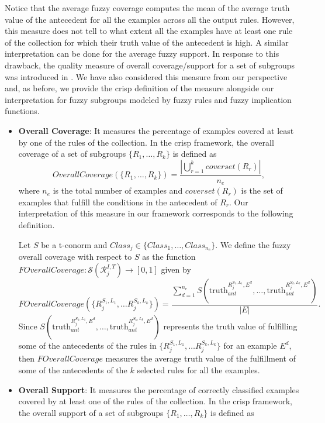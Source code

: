 Notice that the average fuzzy coverage computes the mean of the average truth value of the antecedent for all the examples across all the output rules. However, this measure does not tell to what extent all the examples have at least one rule of the collection for which their truth value of the antecedent is high. A similar interpretation can be done for the average fuzzy support. In response to this drawback, the quality measure of overall coverage/support for a set of subgroups was introduced in \cite{Helal2016}. We have also considered this measure from our perspective and, as before, we provide the crisp definition of the measure alongside our interpretation for fuzzy subgroups modeled by fuzzy rules and fuzzy implication functions.

\begin{itemize}
	\item \textbf{Overall Coverage}: It measures the percentage of examples covered at least by one of the rules of the collection. In the crisp framework, the overall coverage of a set of subgroups $\{R_1,\dots,R_k\}$ is defined as
	$$OverallCoverage(\{R_1,\dots,R_k\}) = \frac{ \left|\displaystyle \bigcup_{r=1}^k coverset(R_r)\right|}{n_e},$$
	where $n_e$ is the total number of examples and $coverset(R_r)$ is the set of examples that fulfill the conditions in the antecedent of $R_r$. Our interpretation of this measure in our framework corresponds to the following definition.
	\begin{definition}\label{def:FOverallCoverage}
		Let $S$ be a t-conorm and $Class_j \in \{Class_1,\dots,Class_{n_c}\}$. We define the fuzzy overall coverage with respect to $S$ as the function $FOverallCoverage : \mathcal{S}(\mathcal{R}^{I,T}_j) \to [0,1]$ given by 
		$$FOverallCoverage(\{R^{S_1,L_1}_{j},\dots R^{S_k,L_k}_{j}\}) = \frac{ \displaystyle \sum_{d=1}^{n_e}S(\text{truth}_{ant}^{R^{S_1,L_1}_j,E^d},\dots, \text{truth}_{ant}^{R^{S_k,L_k}_j,E^d})}{|E|}.$$
		Since $S(\text{truth}_{ant}^{R^{S_1,L_1}_j,E^d},\dots, \text{truth}_{ant}^{R^{S_k,L_k}_j,E^d})$ represents the truth value of fulfilling some of the antecedents of the rules in $\{R^{S_1,L_1}_{j},\dots R^{S_k,L_k}_{j}\}$ for an example $E^d$, then $FOverallCoverage$ measures the average truth value of the fulfillment of some of the antecedents of the $k$ selected  rules for all the examples.
	\end{definition}
	\item \textbf{Overall Support}: It measures the percentage of correctly classified examples covered by at least one of the rules of the collection. In the crisp framework, the overall support of a set of subgroups $\{R_1,\dots,R_k\}$ is defined as

\end{itemize}
